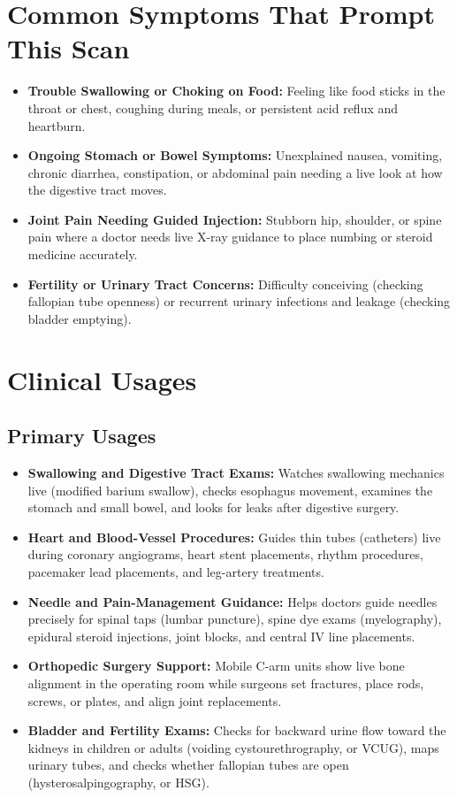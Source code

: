\section{Common Symptoms That Prompt This Scan}
\begin{itemize}
    \item \textbf{Trouble Swallowing or Choking on Food:} Feeling like food sticks in the throat or chest, coughing during meals, or persistent acid reflux and heartburn.
    \item \textbf{Ongoing Stomach or Bowel Symptoms:} Unexplained nausea, vomiting, chronic diarrhea, constipation, or abdominal pain needing a live look at how the digestive tract moves.
    \item \textbf{Joint Pain Needing Guided Injection:} Stubborn hip, shoulder, or spine pain where a doctor needs live X-ray guidance to place numbing or steroid medicine accurately.
    \item \textbf{Fertility or Urinary Tract Concerns:} Difficulty conceiving (checking fallopian tube openness) or recurrent urinary infections and leakage (checking bladder emptying).
\end{itemize}

\section{Clinical Usages}

\subsection{Primary Usages}

\begin{itemize}
    \item \textbf{Swallowing and Digestive Tract Exams:} Watches swallowing mechanics live (modified barium swallow), checks esophagus movement, examines the stomach and small bowel, and looks for leaks after digestive surgery.
    \item \textbf{Heart and Blood-Vessel Procedures:} Guides thin tubes (catheters) live during coronary angiograms, heart stent placements, rhythm procedures, pacemaker lead placements, and leg-artery treatments.
    \item \textbf{Needle and Pain-Management Guidance:} Helps doctors guide needles precisely for spinal taps (lumbar puncture), spine dye exams (myelography), epidural steroid injections, joint blocks, and central IV line placements.
    \item \textbf{Orthopedic Surgery Support:} Mobile C-arm units show live bone alignment in the operating room while surgeons set fractures, place rods, screws, or plates, and align joint replacements.
    \item \textbf{Bladder and Fertility Exams:} Checks for backward urine flow toward the kidneys in children or adults (voiding cystourethrography, or VCUG), maps urinary tubes, and checks whether fallopian tubes are open (hysterosalpingography, or HSG).
\end{itemize}

